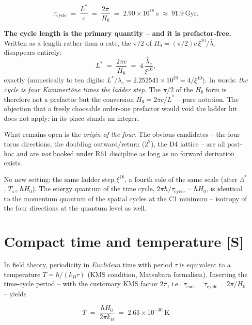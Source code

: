 \begin{equation}
  \tau_\text{cycle} \;=\; \frac{L^{*}}{c}
  \;=\; \frac{2\pi}{H_0}
  \;=\; 2.90\times10^{18}~\text{s}
  \;\approx\; 91.9~\text{Gyr}.
    \label{eq:tauzyk}
\end{equation}

\textbf{The cycle length is the primary quantity -- and it is
prefactor-free.} Written as a length rather than a rate, the
$\pi/2$ of $H_0 = (\pi/2)c\,\xi^{10}/\bar\lambda_e$ disappears
entirely:
\begin{equation}
  L^{*} \;=\; \frac{2\pi c}{H_0}
  \;=\; 4\,\frac{\bar\lambda_e}{\xi^{10}},
  \label{eq:Lstar4}
\end{equation}
exactly (numerically to ten digits: $L^{*}/\bar\lambda_e =
2.252541\times10^{39} = 4/\xi^{10}$). In words: \emph{the cycle is
four Kammertöne times the ladder step.} The $\pi/2$ of the $H_0$
form is therefore not a prefactor but the conversion
$H_0 = 2\pi c/L^{*}$ -- pure notation. The objection that a freely
choosable order-one prefactor would void the ladder hit does not
apply: in its place stands an integer.

What remains open is the \emph{origin of the four}. The obvious
candidates -- the four torus directions, the doubling
outward/return ($2^2$), the D4 lattice -- are all post-hoc and are
\emph{not} booked under R61 discipline as long as no forward
derivation exists.

No new setting: the same ladder step $\xi^{10}$, a fourth role of
the same scale (after $\Lambda^{*}$, $T_w$, $\hbar H_0$). The
energy quantum of the time cycle, $2\pi\hbar/\tau_\text{cycle}
= \hbar H_0$, is identical to the momentum quantum of the spatial
cycles at the C1 minimum -- isotropy of the four directions at the
quantum level as well.

\section{Compact time and temperature [S]}

In field theory, periodicity in \emph{Euclidean} time with period
$\tau$ is equivalent to a temperature $T = \hbar/(k_B\tau)$ (KMS
condition, Matsubara formalism). Inserting the time-cycle period --
with the customary KMS factor $2\pi$, i.e.\
$\tau_\text{eucl} = \tau_\text{cycle} = 2\pi/H_0$ -- yields

\begin{equation}
  \boxed{\;T \;=\; \frac{\hbar H_0}{2\pi k_B}
  \;=\; 2.63\times10^{-30}~\text{K}\;}
  \label{eq:tgh}
\end{equation}

